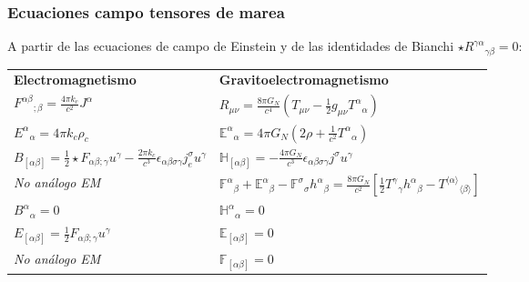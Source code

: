 \documentclass[aspectratio=169,10pt,usenames,dvipsnames,spanish]{beamer}
\begin{document}
\begin{frame}
\frametitle{Ecuaciones campo tensores de marea}
A partir de las ecuaciones de campo de Einstein y de las identidades de Bianchi $\star R^{\gamma\alpha}{}_{\gamma\beta}=0$:

\begin{center}
\renewcommand{\arraystretch}{1.0} %
\setlength{\tabcolsep}{1pt} %

\begin{tabular}{p{} p{}}
\textbf{Electromagnetismo} 
& 
\textbf{Gravitoelectromagnetismo} \\[0.4cm]

$F^{\alpha\beta}{}_{;\beta} = \frac{4\pi k_c}{c^2} J^{\alpha}$ 
& $R_{\mu\nu} = \frac{8\pi G_N}{c^4}\left(T_{\mu\nu} - \tfrac{1}{2}g_{\mu\nu}T^{\alpha}{}_{\alpha}\right)$ \\[0.4cm]

$E^{\alpha}{}_{\alpha}=4\pi k_c \rho_c$
& 
$\mathbb{E}^{\alpha}{}_{\alpha}=4\pi G_N(2\rho+\frac{1}{c^2}T^{\alpha}{}_{\alpha})$ \\[0.4cm]
$B_{[\alpha\beta]}=\frac{1}{2}\star F_{\alpha\beta;\gamma}u^{\gamma}-\frac{2\pi k_c}{c^3}\epsilon_{\alpha\beta\sigma\gamma}j_e^{\sigma}u^{\gamma}$
&
$\mathbb{H}_{[\alpha\beta]}=-\frac{4\pi G_N}{c^3} \epsilon_{\alpha\beta\sigma\gamma}j^{\sigma}u^{\gamma}$ \\[0.4cm]

\textit{No análogo EM}
&
$\mathbb{F}^{\alpha}{}_{\beta}+\mathbb{E}^{\alpha}{}_{\beta}-\mathbb{F}^{\sigma}{}_{\sigma}h^{\alpha}{}_{\beta}=\frac{8\pi G_N}{c^2}[\frac{1}{2}T^{\gamma}{}_{\gamma}h^{\alpha}{}_{\beta}-T^{\langle \alpha \rangle}{}_{\langle \beta\rangle}]$\\[0.4cm]
$B^{\alpha}{}_{\alpha}=0$ & $\mathbb{H}^{\alpha}{}_{\alpha}=0$\\[0.4cm]
$E_{[\alpha\beta]}=\frac{1}{2}F_{\alpha\beta;\gamma}u^{\gamma}$ & $\mathbb{E}_{[\alpha\beta]}=0$\\[0.4cm]
\textit{No análogo EM}
& $\mathbb{F}_{[\alpha\beta]}=0$
\end{tabular}
\end{center}
\end{frame}
\end{document}
